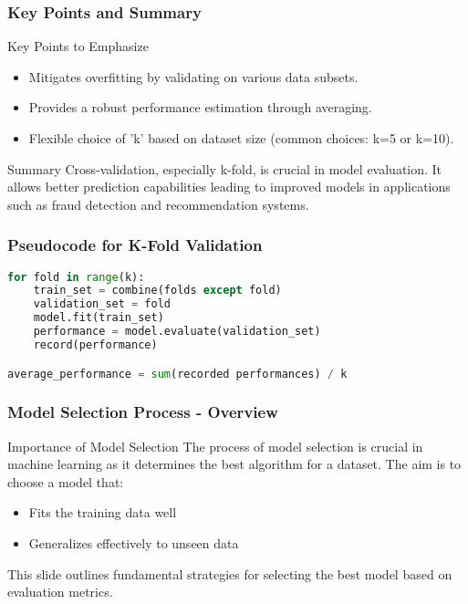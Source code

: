 \documentclass[aspectratio=169]{beamer}
\begin{document}
\begin{frame}[fragile]
    \frametitle{Key Points and Summary}
    \begin{block}{Key Points to Emphasize}
        \begin{itemize}
            \item Mitigates overfitting by validating on various data subsets.
            \item Provides a robust performance estimation through averaging.
            \item Flexible choice of 'k' based on dataset size (common choices: k=5 or k=10).
        \end{itemize}
    \end{block}
    
    \begin{block}{Summary}
        Cross-validation, especially k-fold, is crucial in model evaluation.
        It allows better prediction capabilities leading to improved models in applications such as fraud detection and recommendation systems.
    \end{block}
\end{frame}

\begin{frame}[fragile]
    \frametitle{Pseudocode for K-Fold Validation}
    \begin{lstlisting}[language=Python]
for fold in range(k):
    train_set = combine(folds except fold)
    validation_set = fold
    model.fit(train_set) 
    performance = model.evaluate(validation_set)
    record(performance)

average_performance = sum(recorded performances) / k
    \end{lstlisting}
\end{frame}

\begin{frame}[fragile]
    \frametitle{Model Selection Process - Overview}
    \begin{block}{Importance of Model Selection}
        The process of model selection is crucial in machine learning as it determines the best algorithm for a dataset. The aim is to choose a model that:
        \begin{itemize}
            \item Fits the training data well
            \item Generalizes effectively to unseen data
        \end{itemize}
    \end{block}
    This slide outlines fundamental strategies for selecting the best model based on evaluation metrics.
\end{frame}
\end{document}
